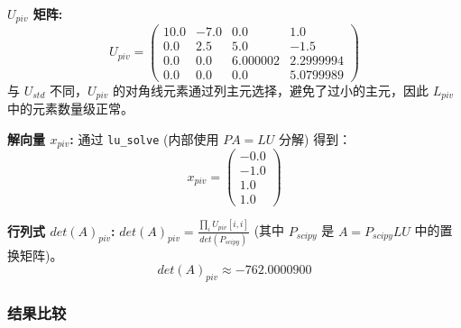 \documentclass[11pt]{article}
\begin{document}
\textbf{\(U_{piv}\) 矩阵:} \[ U_{piv} = \begin{pmatrix}
10.0 & -7.0 & 0.0 & 1.0 \\
0.0 & 2.5 & 5.0 & -1.5 \\
0.0 & 0.0 & 6.000002 & 2.2999994 \\
0.0 & 0.0 & 0.0 & 5.0799989
\end{pmatrix} \] 与 \(U_{std}\) 不同，\(U_{piv}\)
的对角线元素通过列主元选择，避免了过小的主元，因此 \(L_{piv}\)
中的元素数量级正常。

\textbf{解向量 \(x_{piv}\):} 通过 \texttt{lu\_solve} (内部使用 \(PA=LU\)
分解) 得到：
\[ x_{piv} = \begin{pmatrix} -0.0 \\ -1.0 \\ 1.0 \\ 1.0 \end{pmatrix} \]

\textbf{行列式 \(det(A)_{piv}\):}
\(det(A)_{piv} = \frac{\prod_{i} U_{piv}[i,i]}{det(P_{scipy})}\) (其中
\(P_{scipy}\) 是 \(A=P_{scipy}LU\) 中的置换矩阵)。
\[ det(A)_{piv} \approx -762.0000900 \]

\subsubsection{结果比较}\label{ux7ed3ux679cux6bd4ux8f83}
\end{document}
